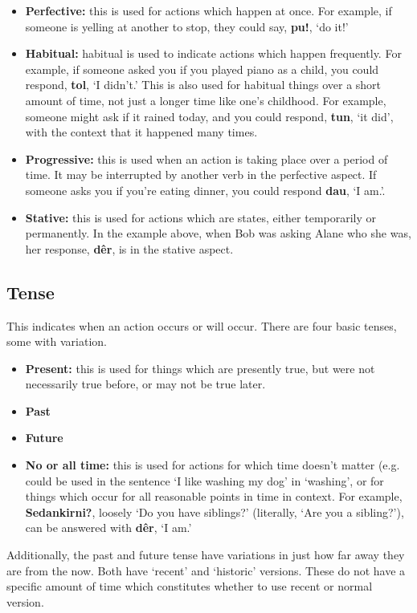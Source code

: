 \documentclass[12pt]{report}
\begin{document}
\begin{itemize}
\item \textbf{Perfective:} this is used for actions which happen at once. For example, if someone is yelling at another to stop, they could say, \textbf{pu!}, `do it!'
\item \textbf{Habitual:} habitual is used to indicate actions which happen frequently. For example, if someone asked you if you played piano as a child, you could respond, \textbf{tol}, `I didn't.' This is also used for habitual things over a short amount of time, not just a longer time like one's childhood. For example, someone might ask if it rained today, and you could respond, \textbf{tun}, `it did', with the context that it happened many times.
\item \textbf{Progressive:} this is used when an action is taking place over a period of time. It may be interrupted by another verb in the perfective aspect. If someone asks you if you're eating dinner, you could respond \textbf{dau}, `I am.'.
\item \textbf{Stative:} this is used for actions which are states, either temporarily or permanently. In the example above, when Bob was asking Alane who she was, her response, \textbf{d\^er}, is in the stative aspect.
\end{itemize}

\subsection{Tense}
This indicates when an action occurs or will occur. There are four basic tenses, some with variation.

\begin{itemize}
\item \textbf{Present:} this is used for things which are presently true, but were not necessarily true before, or may not be true later.
\item \textbf{Past}
\item \textbf{Future}
\item \textbf{No or all time:} this is used for actions for which time doesn't matter (e.g. could be used in the sentence `I like washing my dog' in `washing', or for things which occur for all reasonable points in time in context. For example, \textbf{Sedankirni?}, loosely `Do you have siblings?' (literally, `Are you a sibling?'), can be answered with \textbf{d\^er}, `I am.'
\end{itemize}

Additionally, the past and future tense have variations in just how far away they are from the now. Both have `recent' and `historic' versions. These do not have a specific amount of time which constitutes whether to use recent or normal version. 
\end{document}
